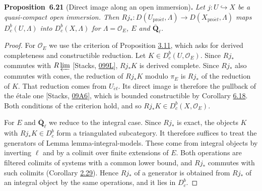 \documentclass[11pt]{article}
\newenvironment{bpstatement}[2]{\par\addvspace{0.6\baselineskip}\noindent\textbf{#1}#2\textbf{.}\enspace\ignorespaces}
  {\par\addvspace{0.4\baselineskip}}
\newenvironment{bpstatementit}[2]{\begin{bpstatement}{#1}{#2}\itshape\ignorespaces}{\end{bpstatement}}
\providecommand{\Dbc}{}\renewcommand{\Dbc}{D^b_c}
\begin{document}
\label{bp577}%
\begin{bpstatementit}{Proposition~6.21}{ (Direct image along an open immersion)}
Let \(j:U\hookrightarrow X\) be a quasi-compact open immersion. Then \(Rj_*:D(U_{\mathrm{pro}\acute{e}t},\Lambda)\to D(X_{\mathrm{pro}\acute{e}t},\Lambda)\) maps \(\Dbc(U,\Lambda)\) into \(\Dbc(X,\Lambda)\) for \(\Lambda=\mathcal O_E\), \(E\) and \(\overline{\mathbf Q}_\ell\).
\end{bpstatementit}

\begin{proof}[{Proof}]\label{bp578}%
For \(\mathcal O_E\) we use the criterion of Proposition \hyperref[bp226]{3.11}, which asks for derived completeness and constructible reduction. Let \(K\in\Dbc(U,\mathcal O_E)\). Since \(Rj_*\) commutes with \(R\varprojlim\) [Stacks, \href{https://stacks.math.columbia.edu/tag/099L}{099L}], \(Rj_*K\) is derived complete. Since \(Rj_*\) also commutes with cones, the reduction of \(Rj_*K\) modulo \(\pi_E\) is \(Rj_*\) of the reduction of \(K\). That reduction comes from \(U_{\acute{e}t}\). Its direct image is therefore the pullback of the étale one [Stacks, \href{https://stacks.math.columbia.edu/tag/09A6}{09A6}], which is bounded constructible by Corollary \hyperref[bp566]{6.18}. Both conditions of the criterion hold, and so \(Rj_*K\in\Dbc(X,\mathcal O_E)\).

For \(E\) and \(\overline{\mathbf Q}_\ell\) we reduce to the integral case. Since \(Rj_*\) is exact, the objects \(K\) with \(Rj_*K\in\Dbc\) form a triangulated subcategory. It therefore suffices to treat the generators of Lemma lemma-integral-models. These come from integral objects by inverting \(\ell\) and by a colimit over finite extensions of \(E\). Both operations are filtered colimits of systems with a common lower bound, and \(Rj_*\) commutes with such colimits (Corollary \hyperref[bp86]{2.29}). Hence \(Rj_*\) of a generator is obtained from \(Rj_*\) of an integral object by the same operations, and it lies in \(\Dbc\).
\end{proof}

\end{document}
